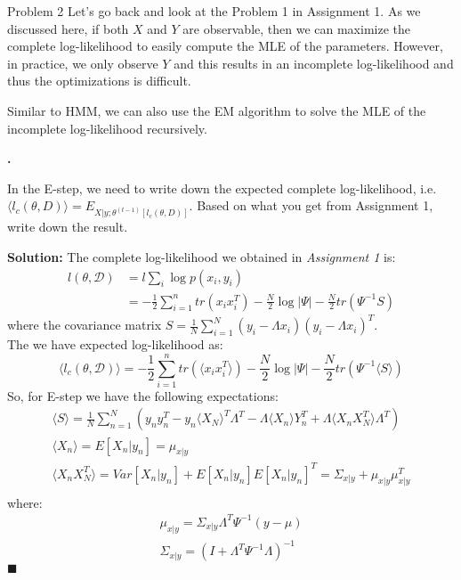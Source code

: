 \documentclass{article}
\newcounter{pcounter}                                   %
\newenvironment{problem}                                %
{                                                       %
    \color{gray}                                        %
    \stepcounter{pcounter}                              %
    \textbf{\arabic{pcounter}.}                         %
}{}                                                     %
\newenvironment{solution}                               %
{\textbf{Solution:} }{$\blacksquare$}                   %
\begin{document}
    \begin{section}{Problem 2}
        \setcounter{pcounter}{0}
        Let's go back and look at the Problem 1 in Assignment 1. As we discussed here, if both $X$ and $Y$ are observable, then we can maximize the complete log-likelihood to easily compute the MLE of the parameters. However, in practice, we only observe $Y$ and this results in an incomplete log-likelihood and thus the optimizations is difficult.

        Similar to HMM, we can also use the EM algorithm to solve the MLE of the incomplete log-likelihood recursively.

        \begin{problem}
            In the E-step, we need to write down the expected complete log-likelihood, i.e. $\langle{l_c(\theta,D)}\rangle = E_{X|y;\theta^{(t-1)}[l_c(\theta,D)]}$. Based on what you get from Assignment 1, write down the result.
        \end{problem}

        \begin{solution}
            The complete log-likelihood we obtained in \textit{Assignment 1} is:
            \begin{align*}
                l(\theta, \mathcal{D}) &= l\sum_i \log{p(x_i, y_i)} \\
                &= -\frac{1}{2} \sum_{i=1}^n tr(x_i x_i^T)
                   - \frac{N}{2} \log{|\Psi|} - \frac{N}{2} tr(\Psi^{-1}S)
            \end{align*}
            where the covariance matrix $S=\frac{1}{N}\sum_{i=1}^N (y_i-\Lambda x_i)(y_i-\Lambda x_i)^T$.\\
            The we have expected log-likelihood as:
            $$
            \langle{l_c(\theta, \mathcal{D})}\rangle = 
                -\frac{1}{2} \sum_{i=1}^n tr(\langle{x_i x_i^T}\rangle)
                - \frac{N}{2} \log{|\Psi|} - \frac{N}{2} tr(\Psi^{-1}\langle{S}\rangle)
            $$
            So, for E-step we have the following expectations:
            \begin{gather*}
                \langle{S}\rangle = \frac{1}{N} \sum_{n=1}^{N} (y_n y_n^T - y_n \langle{X_N}\rangle^T \Lambda^T - \Lambda \langle{X_n}\rangle Y_n^T + \Lambda \langle{X_n X_N^T}\rangle \Lambda^T)\\
                \langle{X_n}\rangle = E[X_n|y_n] = \mu_{x|y} \\
                \langle{X_n X_N^T}\rangle = Var[X_n|y_n] + E[X_n|y_n] E[X_n|y_n]^T = \Sigma_{x|y} + \mu_{x|y} \mu_{x|y}^T\\
            \end{gather*}
            where:
            \begin{gather*}
                \mu_{x|y} = \Sigma_{x|y} \Lambda^T \Psi^{-1} (y-\mu) \\
                \Sigma_{x|y} = (I + \Lambda^T \Psi^{-1} \Lambda)^{-1}
            \end{gather*}
        \end{solution}


\end{section}
\end{document}
